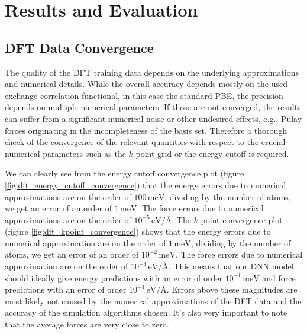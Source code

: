 \chapter{Results and Evaluation}
\label{chap:results-and-evaluation}

\section{DFT Data Convergence}

The quality of the DFT training data depends on the underlying approximations
and numerical details. While the overall accuracy depends mostly on the used
exchange-correlation functional, in this case the standard PBE, the precision
depends on multiple numerical parameters. If those are not converged, the
results can suffer from a significant numerical noise or other undesired
effects, e.g., Pulay forces originating in the incompleteness of the basis
set. Therefore a thorough check of the convergence of the relevant quantities
with respect to the crucial numerical parameters such as the $k$-point grid or
the energy cutoff is required.

We can clearly see from the energy cutoff convergence plot
(figure \ref{fig:dft_energy_cutoff_convergence}) that the energy errors due
to numerical approximations are on the order of $100 \, \mathrm{meV}$,
dividing by the number of atoms, we get an error of an order of
$1 \, \mathrm{meV}$. The force errors due to numerical approximations are on
the order of $10^{-5} \, \mathrm{eV}/\text{\AA}$. The $k$-point convergence
plot (figure \ref{fig:dft_kpoint_convergence}) shows that the energy errors
due to numerical approximation are on the order of $1 \, \mathrm{meV}$,
dividing by the number of atoms, we get an error of an order of
$10^{-2} \, \mathrm{meV}$. The force errors due to numerical approximation are
on the order of $10^{-4} \, \mathrm{eV}/\text{\AA}$. This means that our DNN
model should ideally give energy predictions with an error of order
$10^{-1} \, \mathrm{meV}$ and force predictions with an error of order
$10^{-4} \, \mathrm{eV}/\text{\AA}$. Errors above these magnitudes are
most likely not caused by the numerical approximations of the DFT data and the
accuracy of the simulation algorithms chosen. It's also very important to note
that the average forces are very close to zero.

